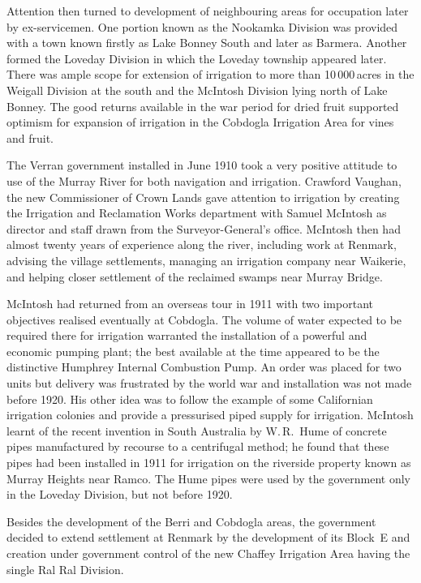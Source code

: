 Attention then turned to development of neighbouring areas for
occupation later by ex-servicemen.  One portion known as the Nookamka
Division was provided with a town known firstly as Lake Bonney South
and later as Barmera.  Another formed the Loveday
Division in which the Loveday township appeared later.  There was
ample scope for extension of irrigation to more than 10\,000\,acres in
the Weigall Division at the south and the McIntosh Division lying
north of Lake Bonney.   The good returns available
in the war period for dried fruit supported optimism for expansion of
irrigation in the Cobdogla Irrigation Area for vines and fruit.

The Verran government installed in June 1910 took a very positive
attitude to use of the Murray River for both navigation and
irrigation.  Crawford Vaughan,   the new
Commissioner of Crown Lands gave attention to irrigation by creating
the Irrigation and Reclamation Works department with Samuel McIntosh
as director and staff drawn from the Surveyor-General's office.
McIntosh  then had almost twenty years of
experience along the river, including work at Renmark, advising the
village settlements, managing an irrigation company near Waikerie,
 and
helping closer settlement of the reclaimed swamps near Murray
Bridge.

McIntosh had returned from an overseas tour in 1911 with two important
objectives realised eventually at Cobdogla.  The volume of water
expected to be required there for irrigation warranted the
installation of a powerful and economic pumping plant; the best
available at the time appeared to be the distinctive Humphrey Internal
Combustion Pump.  An order was placed for two
units but delivery was frustrated by the world war and installation
was not made before 1920.  His other idea was to follow the example of
some Californian irrigation colonies and provide a pressurised piped
supply for irrigation.  McIntosh learnt of the recent invention in
South Australia by W.\,R.~Hume  of concrete pipes
manufactured by recourse to a centrifugal method; he found that these
pipes had been installed in 1911 for irrigation on the riverside
property known as Murray Heights near Ramco.  The Hume pipes
 were used by the government only in the Loveday
Division, but not before 1920.

Besides the development of the Berri and Cobdogla areas, the
government decided to extend settlement at Renmark by the development
of its Block~E and creation under government control of the new
Chaffey Irrigation Area  having the
single Ral Ral Division.

